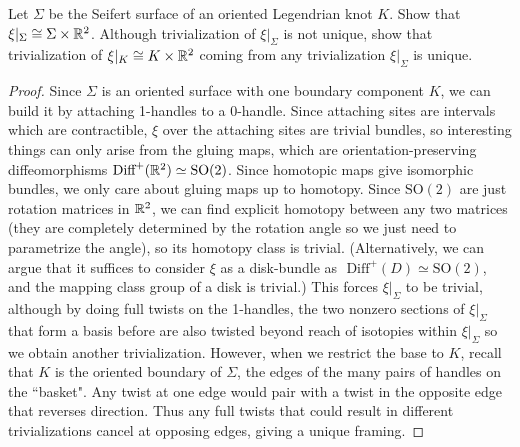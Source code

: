 \documentclass[12pt]{article}
\begin{document}
\begin{problem}[2]
Let $ \Sigma $ be the Seifert surface of an oriented Legendrian knot $ K$. Show that $ \xi|_{ \Sigma } \cong \Sigma \times \mathbb{R}^2$. Although trivialization of  $ \xi|_{ \Sigma  }$ is not unique, show that trivialization of $ \xi|_{K} \cong K \times \mathbb{R}^2$ coming from any trivialization $ \xi|_{ \Sigma }$ is unique.

\begin{proof}
Since $ \Sigma $ is an oriented surface with one boundary component $ K$, we can build it by attaching 1-handles to a 0-handle. Since attaching sites are intervals which are contractible, $ \xi$ over the attaching sites are trivial bundles, so interesting things can only arise from the gluing maps, which are orientation-preserving diffeomorphisms $ \text{Diff}^{+}(\mathbb{R}^2) \simeq \text{SO}(2)$. Since homotopic maps give isomorphic bundles, we only care about gluing maps up to homotopy. Since $ \text{SO}(2)$ are just rotation matrices in $ \mathbb{R}^2$, we can find explicit homotopy between any two matrices (they are completely determined by the rotation angle so we just need to parametrize the angle), so its homotopy class is trivial. (Alternatively, we can argue that it suffices to consider $ \xi$ as a disk-bundle as $ \text{ Diff}^{+}(D) \simeq \text{SO}(2)$, and the mapping class group of a disk is trivial.) This forces $ \xi|_{ \Sigma }$ to be trivial, although by doing full twists on the 1-handles, the two nonzero sections of $ \xi|_{ \Sigma }$ that form a basis before are also twisted beyond reach of isotopies within $ \xi|_{ \Sigma }$ so we obtain another trivialization. However, when we restrict the base to $ K$, recall that  $ K$ is the oriented boundary of  $ \Sigma $, the edges of the many pairs of handles on the ``basket". Any twist at one edge would pair with a twist in the opposite edge that reverses direction. Thus any full twists that could result in different trivializations cancel at opposing edges, giving a unique framing.
\end{proof}
\end{problem}
\end{document}

